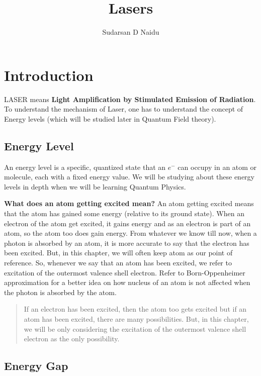 \documentclass[12pt]{article}
\begin{document}
\title{Lasers}
\author{Sudarsan D Naidu}
\maketitle

\tableofcontents

\section{Introduction}

LASER means \textbf{Light Amplification by Stimulated Emission of Radiation}. To understand the mechanism of Laser, one has to understand the concept of Energy levels (which will be studied later in Quantum Field theory).

\subsection{Energy Level}

An energy level is a specific, quantized state that an $e^{-}$ can occupy in an atom or molecule, each with a fixed energy value. We will be studying about these energy levels in depth when we will be learning Quantum Physics. \vspace{.2cm}

\textbf{What does an atom getting excited mean?} An atom getting excited means that the atom has gained some energy (relative to its ground state). When an electron of the atom get excited, it gains energy and as an electron is part of an atom, so the atom too does gain energy. From whatever we know till now, when a photon is absorbed by an atom, it is more accurate to say that the electron has been excited. But, in this chapter, we will often keep atom as our point of reference. So, whenever we say that an atom has been excited, we refer to excitation of the outermost valence shell electron. Refer to Born-Oppenheimer approximation for a better idea on how nucleus of an atom is not affected when the photon is absorbed by the atom.

\begin{quote}
    If an electron has been excited, then the atom too gets excited but if an atom has been excited, there are many possibilities. But, in this chapter, we will be only considering the excitation of the outermost valence shell electron as the only possibility.
\end{quote}

\subsection{Energy Gap}
\end{document}
